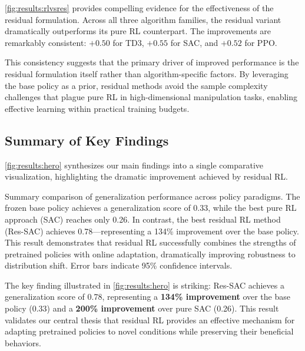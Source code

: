 \autoref{fig:results:rlvsres} provides compelling evidence for the effectiveness of the residual formulation. Across all three algorithm families, the residual variant dramatically outperforms its pure \ac{RL} counterpart. The improvements are remarkably consistent: $+0.50$ for TD3, $+0.55$ for SAC, and $+0.52$ for PPO.

This consistency suggests that the primary driver of improved performance is the residual formulation itself rather than algorithm-specific factors. By leveraging the base policy as a prior, residual methods avoid the sample complexity challenges that plague pure \ac{RL} in high-dimensional manipulation tasks, enabling effective learning within practical training budgets.

\subsection{Summary of Key Findings}
\label{sec:results:summary}

\autoref{fig:results:hero} synthesizes our main findings into a single comparative visualization, highlighting the dramatic improvement achieved by residual \ac{RL}.

{Summary comparison of generalization performance across policy paradigms. The frozen base policy achieves a generalization score of 0.33, while the best pure \ac{RL} approach (SAC) reaches only 0.26. In contrast, the best residual \ac{RL} method (Res-SAC) achieves 0.78---representing a 134\% improvement over the base policy. This result demonstrates that residual \ac{RL} successfully combines the strengths of pretrained policies with online adaptation, dramatically improving robustness to distribution shift. Error bars indicate 95\% confidence intervals.}

The key finding illustrated in \autoref{fig:results:hero} is striking: Res-SAC achieves a generalization score of 0.78, representing a \textbf{134\% improvement} over the base policy (0.33) and a \textbf{200\% improvement} over pure SAC (0.26). This result validates our central thesis that residual \ac{RL} provides an effective mechanism for adapting pretrained policies to novel conditions while preserving their beneficial behaviors.


